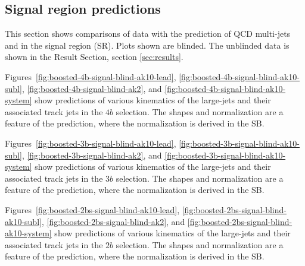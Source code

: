 \clearpage




\subsection{Signal region predictions}
\label{sec:boosted-SR}This section shows comparisons of data with the prediction of QCD multi-jets and \ttbar in the signal region (SR). Plots shown are blinded. The unblinded data is shown in the Result Section, section \ref{sec:results}.

Figures~\ref{fig:boosted-4b-signal-blind-ak10-lead}, \ref{fig:boosted-4b-signal-blind-ak10-subl}, \ref{fig:boosted-4b-signal-blind-ak2}, and \ref{fig:boosted-4b-signal-blind-ak10-system} show predictions of various kinematics of the large-\R jets and their associated track jets in the $4b$ selection. The shapes and normalization are a feature of the prediction, where the normalization is derived in the SB. %

Figures~\ref{fig:boosted-3b-signal-blind-ak10-lead}, \ref{fig:boosted-3b-signal-blind-ak10-subl}, \ref{fig:boosted-3b-signal-blind-ak2}, and \ref{fig:boosted-3b-signal-blind-ak10-system} show predictions of various kinematics of the large-\R jets and their associated track jets in the $3b$ selection. The shapes and normalization are a feature of the prediction, where the normalization is derived in the SB. %

Figures~\ref{fig:boosted-2bs-signal-blind-ak10-lead}, \ref{fig:boosted-2bs-signal-blind-ak10-subl}, \ref{fig:boosted-2bs-signal-blind-ak2}, and \ref{fig:boosted-2bs-signal-blind-ak10-system} show predictions of various kinematics of the large-\R jets and their associated track jets in the $2b$ selection. The shapes and normalization are a feature of the prediction, where the normalization is derived in the SB. %

